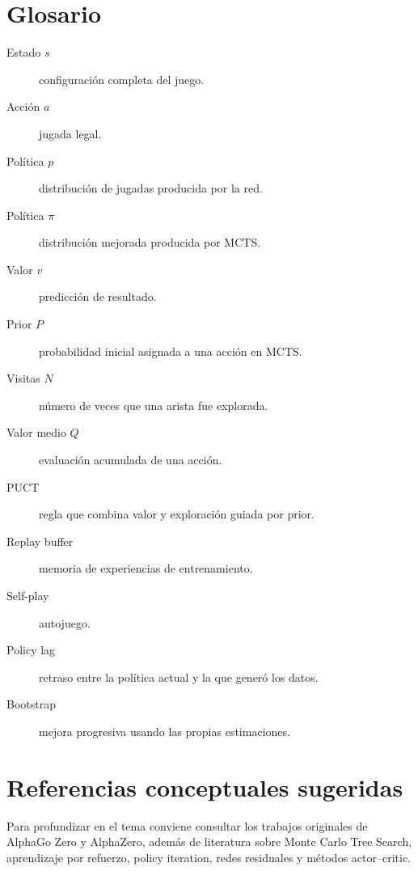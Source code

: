\documentclass[11pt,a4paper]{article}
\begin{document}
\section{Glosario}

\begin{description}
    \item[Estado \(s\)] configuración completa del juego.
    \item[Acción \(a\)] jugada legal.
    \item[Política \(p\)] distribución de jugadas producida por la red.
    \item[Política \(\pi\)] distribución mejorada producida por MCTS.
    \item[Valor \(v\)] predicción de resultado.
    \item[Prior \(P\)] probabilidad inicial asignada a una acción en MCTS.
    \item[Visitas \(N\)] número de veces que una arista fue explorada.
    \item[Valor medio \(Q\)] evaluación acumulada de una acción.
    \item[PUCT] regla que combina valor y exploración guiada por prior.
    \item[Replay buffer] memoria de experiencias de entrenamiento.
    \item[Self-play] autojuego.
    \item[Policy lag] retraso entre la política actual y la que generó los datos.
    \item[Bootstrap] mejora progresiva usando las propias estimaciones.
\end{description}

\section{Referencias conceptuales sugeridas}

Para profundizar en el tema conviene consultar los trabajos originales de AlphaGo Zero y AlphaZero, además de literatura sobre Monte Carlo Tree Search, aprendizaje por refuerzo, policy iteration, redes residuales y métodos actor--critic.
\end{document}
